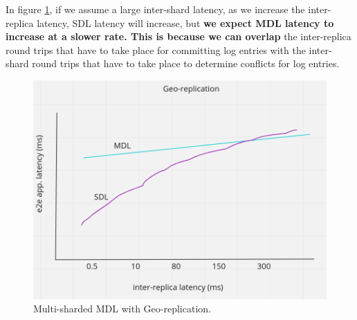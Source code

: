 In figure \ref{fig:geo-rep}, if we assume a large inter-shard latency, as we increase the inter-replica latency, SDL latency will increase, but \textbf{we expect MDL latency to increase at a slower rate. This is because we can overlap} the inter-replica round trips that have to take place for committing log entries with the inter-shard round trips that have to take place to determine conflicts for log entries.
\begin{figure}[!htb]
\includegraphics[scale=.25]{geo-rep.png}
\caption{Multi-sharded MDL with Geo-replication.}
\label{fig:geo-rep}
\end{figure}